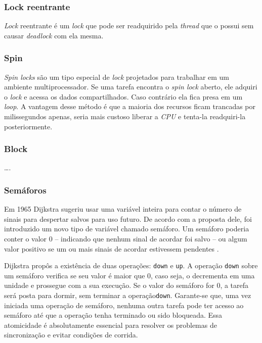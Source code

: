 \subsubsection{Lock reentrante}

\textit{Lock} reentrante é um \textit{lock} que pode ser readquirido pela
\textit{thread} que o possui sem causar \textit{deadlock} com ela mesma.

\subsubsection{Spin}

\textit{Spin locks} são um tipo especial de \textit{lock} projetados
para trabalhar em um ambiente multiprocessador. Se uma tarefa encontra
o \textit{spin lock} aberto, ele adquiri o \textit{lock} e acessa os
dados compartilhados.  Caso contrário ela fica presa em um {\it loop}.
A vantagem desse método é que a maioria dos recursos ficam trancadas por
milissegundos apenas, seria mais custoso liberar a \textit{CPU} e tenta-la
readquiri-la posteriormente.

\subsubsection{Block}
….


\subsubsection{Semáforos}

Em 1965 Dijkstra sugeriu usar uma variável inteira para contar o número de
sinais para despertar salvos para uso futuro.  De acordo com a proposta dele,
foi introduzido um novo tipo de variável chamado semáforo. Um semáforo
poderia conter o valor 0 – indicando que nenhum sinal de acordar foi
salvo – ou algum valor positivo se um ou mais sinais de acordar estivessem
pendentes \cite{TANE}.

Dijkstra propôs a existência de duas operações: \texttt{down} e
\texttt{up}. A operação \texttt{down} sobre um semáforo verifica se seu
valor é maior que 0, caso seja, o decrementa em uma unidade e prossegue
com a sua execução.  Se o valor do semáforo for 0, a tarefa será posta
para dormir, sem terminar a operação\texttt{down}. Garante-se que, uma vez
iniciada uma operação de semáforo, nenhuma outra tarefa pode ter acesso
ao semáforo até que a operação tenha terminado ou sido bloqueada. Essa
atomicidade é absolutamente essencial para resolver os problemas de
sincronização e evitar condições de corrida.


